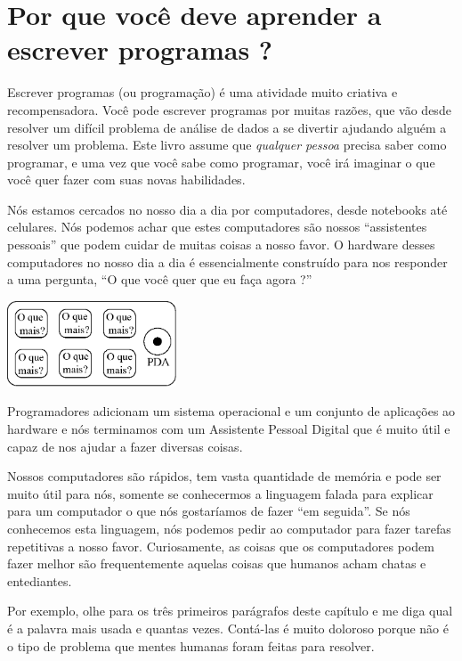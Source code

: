 
\chapter{Por que você deve aprender a escrever programas ?}

Escrever programas (ou programação) é uma atividade
muito criativa e recompensadora. Você pode escrever programas por
muitas razões, que vão desde resolver um difícil problema de 
análise de dados a se divertir ajudando alguém a resolver um
problema. Este livro assume que \emph{qualquer pessoa} precisa
saber como programar, e uma vez que você sabe como programar,
você irá imaginar o que você quer fazer com suas novas habilidades.

Nós estamos cercados no nosso dia a dia por computadores, desde
notebooks até celulares. Nós podemos achar que estes computadores
são nossos ``assistentes pessoais'' que podem cuidar de muitas coisas
a nosso favor. O hardware desses computadores no nosso dia a dia é
essencialmente construído para nos responder a uma pergunta,
``O que você quer que eu faça agora ?''

\beforefig
\centerline{\includegraphics[height=1.00in]{figs2/pda.eps}}
\afterfig

Programadores adicionam um sistema operacional e um conjunto de
aplicações ao hardware e nós terminamos com um Assistente 
Pessoal Digital que é muito útil e capaz de nos ajudar a fazer
diversas coisas.

Nossos computadores são rápidos, tem vasta quantidade de memória
e pode ser muito útil para nós, somente se conhecermos a linguagem
falada para explicar para um computador o que nós gostaríamos
de fazer ``em seguida''. Se nós conhecemos esta linguagem, nós
podemos pedir ao computador para fazer tarefas repetitivas a 
nosso favor. Curiosamente, as coisas que os computadores
podem fazer melhor são frequentemente aquelas coisas que humanos
acham chatas e entediantes.

Por exemplo, olhe para os três primeiros parágrafos deste
capítulo e me diga qual é a palavra mais usada e quantas 
vezes. Contá-las é muito doloroso porque 
não é o tipo de problema que mentes humanas foram feitas para 
resolver.

